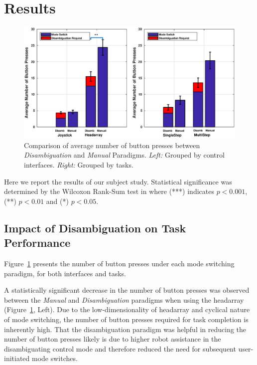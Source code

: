 \documentclass[natbib, twocolumn]{svjour3}          %
\begin{document}


\section{Results}\label{sec:results}

\begin{figure}[ht!]
	\centering
	\includegraphics[keepaspectratio, width = 0.91\hsize ,center]{Fig8.eps}
	\caption{Comparison of average number of button presses between \textit{Disambiguation} and \textit{Manual} Paradigms. \textit{Left:} Grouped by control interfaces. \textit{Right:} Grouped by tasks.}
	\label{fig:button_press}
\end{figure}
Here we report the results of our subject study. Statistical significance was determined by the Wilcoxon Rank-Sum test in where (***) indicates $p < 0.001$, (**) $p < 0.01$ and (*) $p < 0.05$. 

\subsection{Impact of Disambiguation on Task Performance}
Figure~\ref{fig:button_press} presents the number of button presses under each mode switching paradigm, for both interfaces and tasks. 

A statistically significant decrease in the number of button presses was observed between the \textit{Manual} and \textit{Disambiguation} paradigms when using the headarray (Figure~\ref{fig:button_press}, Left). Due to the low-dimensionality of headarray and cyclical nature of mode switching, the number of button presses required for task completion is inherently high. That the disambiguation paradigm was helpful in reducing the number of button presses likely is due to higher robot assistance in the disambiguating control mode and therefore reduced the need for subsequent user-initiated mode switches. 
\end{document}
